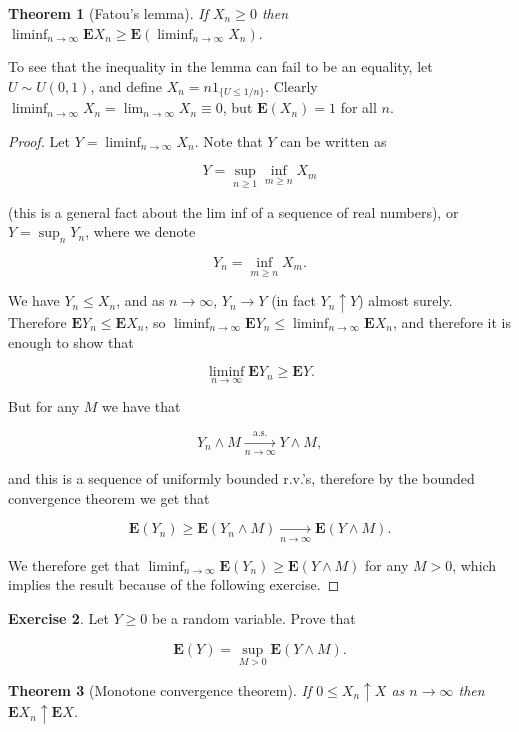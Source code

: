 \documentclass[11pt]{report}
\theoremstyle{plain}
\newtheorem{thm}{Theorem}[chapter]
\theoremstyle{definition}
\newtheorem{xexercise}[thm]{Exercise}
\begin{document}
\begin{thm}[Fatou's lemma]
If $X_n \ge 0$ then
$\liminf_{n\to\infty} \mathbf{E} X_n \ge
\mathbf{E}(\liminf_{n\to\infty} X_n).$
\end{thm}

\noindent To see that the inequality in the lemma can fail to
be an equality, let $U \sim U(0,1)$, and define
$X_n = n 1_{\{U\le 1/n\}}$. Clearly
$\liminf_{n\to\infty}X_n=\lim_{n\to\infty} X_n \equiv
0$,
but $\mathbf{E}(X_n) = 1$ for all $n$.

\begin{proof}
Let $Y = \liminf_{n\to\infty} X_n$. Note that $Y$ can
be written as

\[
Y = \sup_{n\ge 1} \inf_{m\ge n} X_m
\]

\noindent (this is a general fact about the lim inf of a
sequence of real numbers), or $Y = \sup_n Y_n$, where
we denote

\[
Y_n = \inf_{m\ge n} X_m.
\]

\noindent We have $Y_n \le X_n$, and as $n\to\infty$,
$Y_n \to Y$ (in fact $Y_n \uparrow Y$) almost surely.
Therefore $\mathbf{E} Y_n \le \mathbf{E} X_n$, so
$\liminf_{n\to\infty} \mathbf{E} Y_n \le
\liminf_{n\to\infty} \mathbf{E} X_n$,
and therefore it is enough to show that

\[
\liminf_{n\to\infty} \mathbf{E} Y_n \ge \mathbf{E} Y.
\]

\noindent But for any $M$ we have that

\[
Y_n \wedge M \xrightarrow[n\to\infty]{\textrm{a.s.}} Y \wedge M,
\]

\noindent and this is a sequence of uniformly bounded r.v.'s,
therefore by the bounded convergence theorem we get
that

\[
\mathbf{E}(Y_n) \ge \mathbf{E}(Y_n \wedge M) \xrightarrow[n\to\infty]{} \mathbf{E}(Y\wedge M).
\]

\noindent We therefore get that
$\liminf_{n\to\infty} \mathbf{E}(Y_n)\ge
\mathbf{E}(Y\wedge M)$
for any $M>0$, which implies the result because of
the following exercise.
\end{proof}

\begin{xexercise}
Let $Y\ge 0$ be a random variable. Prove that

\[
\mathbf{E}(Y) = \sup_{M>0} \mathbf{E}(Y\wedge M).
\]

\end{xexercise}

\begin{thm}[Monotone convergence theorem]
If $0\le X_n \uparrow X$ as $n\to\infty$ then
$\mathbf{E} X_n \uparrow \mathbf{E} X$.
\end{thm}
\end{document}
